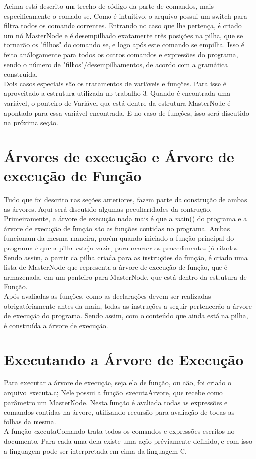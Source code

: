 \documentclass[a4paper,10pt]{article}
\begin{document}
	Acima está descrito um trecho de código da parte de comandos, mais especificamente o comado se. Como é intuitivo, o arquivo possui um switch
	para filtra todos os comando correntes. Entrando no caso que lhe pertença, é criado um nó MasterNode e é desempilhado exatamente três posições
	na pilha, que se tornarão os "filhos" do comando se, e logo após este comando se empilha. Isso é feito análogamente para todos os outros
	comandos e expressões do programa, sendo o número de "filhos"/desempilhamentos, de acordo com a gramática construída.
	\\
	
	Dois casos especiais são os tratamentos de variáveis e funções. Para isso é aproveitado a estrutura utilizada no trabalho 3. Quando é
	encontrada uma variável, o ponteiro de Variável que está dentro da estrutura MasterNode é apontado para essa variável encontrada. E no caso
	de funções, isso será discutido na próxima seção.
	
\section{Árvores de execução e Árvore de execução de Função}
	Tudo que foi descrito nas seções anteriores, fazem parte da construção de ambas as árvores. Aqui será discutido algumas peculiaridades da
	contrução. Primeiramente, a árvore de execução nada mais é que a \textit main() do programa e a árvore de execução de função são as 
	funções contidas no programa. Ambas funcionam da mesma maneira, porém quando iniciado a função principal do programa é que a pilha esteja 
	vazia, para ocorrer os procedimentos já citados. Sendo assim, a partir da pilha criada para as instruções da função, é criado uma lista
	de MasterNode que representa a àrvore de execução de função, que é armazenada, em um ponteiro para MasterNode, que está dentro da estrutura
	de Função. 
	\\
	Após avaliadas as funções, como as declarações devem ser realizadas obrigatóriamente antes da main, todas as instruções a seguir pertencerão a
	árvore de execução do programa. Sendo assim, com o conteúdo que ainda está na pilha, é construída a árvore de execução.
	
\section{Executando a Árvore de Execução}	
	Para executar a árvore de execução, seja ela de função, ou não, foi criado o arquivo \textit executa.c; Nele possui a função 
	\textit executaArvore, que recebe como parâmetro um MasterNode. Nesta função é avaliada todas as expressões e comandos contidas na
	árvore, utilizando recursão para avaliação de todas as folhas da mesma.
	\\
	A função \textit executaComando trata todos os comandos e expressões escritos no documento. Para cada uma dela existe uma ação
	préviamente definido, e com isso a linguagem pode ser interpretada em cima da linguagem C.
	
\end{document}

